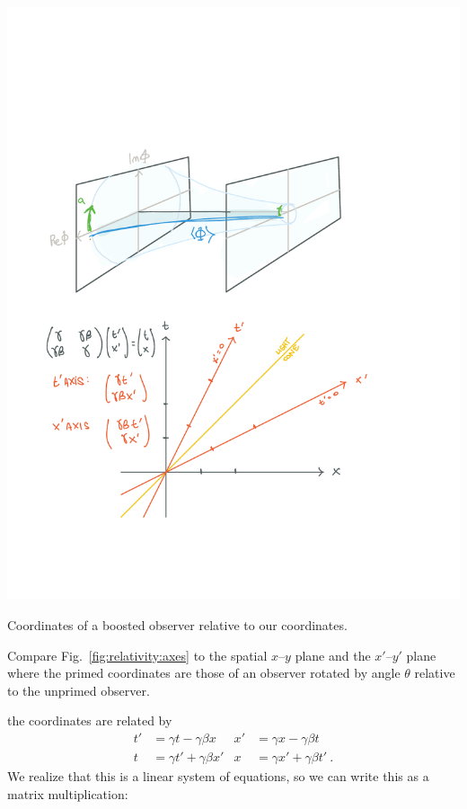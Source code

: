 \documentclass[12pt, oneside]{report}    %
\begin{document}
\begin{marginfigure}%
    \includegraphics[width=\textwidth]{figures/rel_axes.pdf}
    \caption{Coordinates of a boosted observer relative to our coordinates.}
    \label{fig:relativity:axes}
\end{marginfigure}
\begin{exercise}
Compare Fig.~\ref{fig:relativity:axes} to the spatial $x$--$y$ plane and the $x'$--$y'$ plane where the primed coordinates are those of an observer rotated by angle $\theta$ relative to the unprimed observer.
\end{exercise}
the coordinates are related by
\begin{align}
    t' &= \gamma t - \gamma\beta x &
    x' &= \gamma x - \gamma\beta t \\
    t &= \gamma t' + \gamma\beta x' &
    x &= \gamma x' + \gamma\beta t' 
    \ .
    \label{eq:Lorentz:2D:in:equations}
\end{align}
We realize that this is a linear system of equations, so we can write this as a matrix multiplication:
\end{document}

